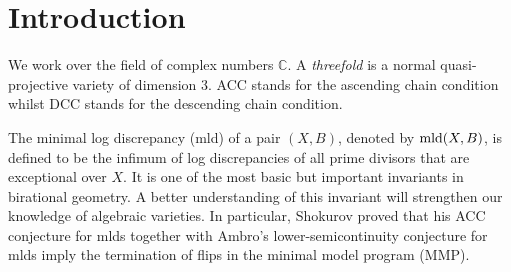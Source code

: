 \documentclass[11pt]{amsart}
\numberwithin{equation}{section}
\newcommand{\Zz}{\mathbb{Z}}
\newcommand{\mld}{{\rm{mld}}}
\newcommand{\CT}{\operatorname{CT}}
\theoremstyle{definition}
\theoremstyle{definition}
\begin{document}

\author[J. ~Han]{Jingjun Han}
\address{Shanghai Center for Mathematical Sciences, Fudan University, Jiangwan Campus, Shanghai, 200438, China}
\address{Department of Mathematics, The University of Utah, Salt Lake City, UT 84112, USA}
\address{Mathematical Sciences Research Institute, Berkeley, CA 94720, USA}

	\author[J. ~Liu]{Jihao Liu}
\address{Department of Mathematics, Northwestern University, 2033 Sheridan Rd, Evanston, IL 60208}

\author[Y. ~Luo]{Yujie Luo}
\address{Department of Mathematics, Johns Hopkins University, Baltimore, MD 21218, USA}


\date{\today}




\maketitle


\tableofcontents


\section{Introduction}
We work over the field of complex numbers $\mathbb C$. A \emph{threefold} is a normal quasi-projective variety of dimension 3. ACC stands for the ascending chain condition whilst DCC stands for the
descending chain condition.

The minimal log discrepancy (mld) of a pair $(X,B)$, denoted by $\mld(X,B)$, is defined to be the infimum of log discrepancies of all prime divisors that are exceptional over $X$. It is one of the most basic but important invariants in birational geometry. A better understanding of this invariant will strengthen our knowledge of algebraic varieties. In particular, Shokurov \cite{Sho04a} proved that his ACC conjecture for mlds \cite[Problem 5]{Sho88} together with Ambro's lower-semicontinuity conjecture for mlds \cite[Conjecture 0.2]{Amb99} imply the termination of flips in the minimal model program (MMP).
\end{document}
